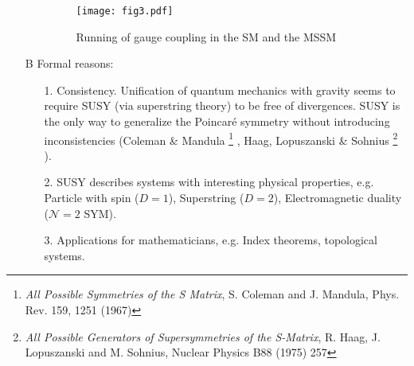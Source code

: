 \documentclass[a4paper,12pt]{article}
\numberwithin{equation}{section}
\numberwithin{exe}{section}
\begin{document}
\begin{enumerate}
\begin{enumerate}
		\begin{figure}[ht]
			\centering
			\texttt{[image: fig3.pdf]}
			\caption{Running of gauge coupling in the SM and the MSSM}
			\end{figure}
		\end{enumerate}
		
	\item[B] Formal reasons:
		\begin{enumerate}
		\item[1.] Consistency.
		Unification of quantum mechanics with gravity seems to require SUSY (via superstring theory) to be free of divergences.
		SUSY is the only way to generalize the Poincar\'e symmetry without introducing inconsistencies (Coleman \& Mandula%
		\footnote{ {\it All Possible Symmetries of the S Matrix}, S. Coleman and J. Mandula, Phys. Rev. 159, 1251 (1967)}%
		, Haag, Lopuszanski \& Sohnius%
		\footnote{ {\it All Possible Generators of Supersymmetries of the S-Matrix}, R. Haag, J. Lopuszanski and M. Sohnius, Nuclear Physics B88 (1975) 257 }%
		).
		\item[2.] SUSY describes systems with interesting physical properties, e.g.
		Particle with spin ($D=1$), Superstring ($D=2$), Electromagnetic duality ($\mathcal N=2$ SYM).
		\item[3.] Applications for mathematicians, e.g.
		Index theorems, topological systems.
		\end{enumerate}
	\end{enumerate}
\end{document}
